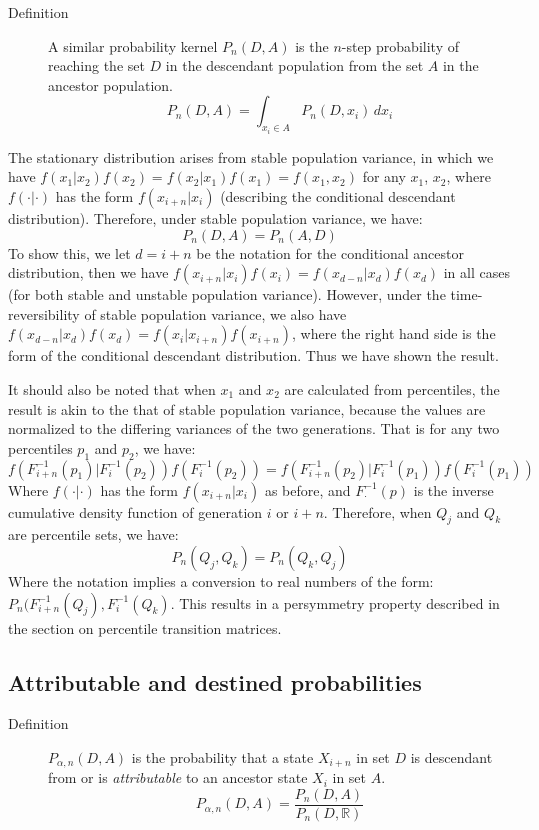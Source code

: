 \documentclass[a4paper,11pt]{article} %
\begin{document}
\begin{description}
\item [Definition] A similar probability kernel $P_n(D, A)$ is the $n$-step probability of reaching the set $D$ in the descendant population from the set $A$ in the ancestor population. 
$$P_n(D, A) = \int_{x_i\in A}^{} P_n(D, x_i) \, dx_i$$
\end{description}

The stationary distribution arises from stable population variance, in which we have $f(x_1|x_2)f(x_2) = f(x_2|x_1)f(x_1) = f(x_1, x_2)$ for any $x_1$, $x_2$, where $f(\cdot|\cdot)$ has the form $f(x_{i+n}|x_i)$ (describing the conditional descendant distribution). Therefore, under stable population variance, we have: 
$$P_n(D, A) = P_n(A, D)$$
To show this, we let $d = i+n$ be the notation for the conditional ancestor distribution, then we have $f(x_{i+n}|x_i)f(x_i) = f(x_{d-n}|x_d)f(x_d)$ in all cases (for both stable and unstable population variance). However, under the time-reversibility of stable population variance, we also have $f(x_{d-n}|x_d)f(x_d) = f(x_{i}|x_{i+n})f(x_{i+n})$, where the right hand side is the form of the conditional descendant distribution. Thus we have shown the result. 

It should also be noted that when $x_1$ and $x_2$ are calculated from percentiles, the result is akin to the that of stable population variance, because the values are normalized to the differing variances of the two generations. That is for any two percentiles $p_1$ and $p_2$, we have: 
$$f(F_{i+n}^{-1}(p_1)|F_i^{-1}(p_2))f(F_i^{-1}(p_2)) = f(F_{i+n}^{-1}(p_2)|F_i^{-1}(p_1))f(F_i^{-1}(p_1))$$
Where $f(\cdot|\cdot)$ has the form $f(x_{i+n}|x_i)$ as before, and $F_{\cdot}^{-1}(p)$ is the inverse cumulative density function of generation $i$ or $i+n$. Therefore, when $Q_j$ and $Q_k$ are percentile sets, we have:
$$P_n(Q_j, Q_k) = P_n(Q_k, Q_j)$$ 
Where the notation implies a conversion to real numbers of the form: $P_n(F_{i+n}^{-1}(Q_j), F_i^{-1}(Q_k)$. This results in a persymmetry property described in the section on percentile transition matrices. 


\subsection{Attributable and destined probabilities}

\begin{description}
\item [Definition] $P_{\alpha , n}(D, A)$ is the probability that a state $X_{i+n}$ in set $D$ is descendant from or is \emph{attributable} to an ancestor state $X_i$ in set $A$.
$$P_{\alpha , n}(D, A) = \frac{P_n(D, A)}{P_n(D, \mathbb{R})}$$
\end{description}
\end{document}
